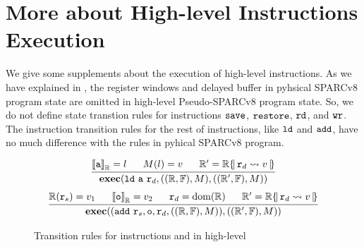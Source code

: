 \section{More about High-level Instructions Execution}
\label{appendix:more-about-high-level-insExec}

We give some supplements about the execution of high-level instructions. 
As we have explained in \Sec{\ref{subsec:High-level Pseudo-SPARCv8 Language}}, 
the register windows and delayed buffer in pyhsical SPARCv8 program state 
are omitted in high-level Pseudo-SPARCv8 program state. So, we do not define  
state transtion rules for instructions $\texttt{save}{}$, $\texttt{restore}{}$, $\texttt{rd}{}$, 
and $\texttt{wr}{}$. The instruction transition rules for the rest of instructions, like  
$\texttt{ld}{}$ and $\texttt{add}{}$, have no much difference with the rules in pyhical SPARCv8 program. 
\begin{figure}[!h]
    \centering
    \[
        \begin{array}{c}
            \infer
            {
                \hexeci{\ld \ \aexp \ \reg{d}}{((\hRfile, \hWstk), \Mem)}
                    {((\hRfile', \hWstk), \Mem)}
            }
            {
                \evalR{\aexp}{\hRfile} = \loc \quad \ \ 
                \Mem(\loc) = \val \quad \ \ 
                \hRfile' = \hRfile\hRegUpd{ \reg{d} \rightsquigarrow \val } 
            } \\
            \\[-5pt]
            \infer
            {
                \hexeci{(\cadd \ \reg{s}, \oexp, \reg{d}}{((\hRfile, \hWstk), \Mem))}
                    {((\hRfile', \hWstk), \Mem)}
            }
            {
                \hRfile(\reg{s}) = \val_1 \quad \ \ 
                \evalR{\oexp}{\hRfile} = \val_2 \quad \ \ 
                \reg{d} = \dom(\hRfile) \quad \ \ 
                \hRfile' = \hRfile\hRegUpd{ \reg{d} \rightsquigarrow \val }
            }
        \end{array}
    \]
    \caption{Transition rules for instructions \ld{} and \cadd{} in high-level}
    \label{fig:Transition rules for instructions ld and add in high-level}
\end{figure}

